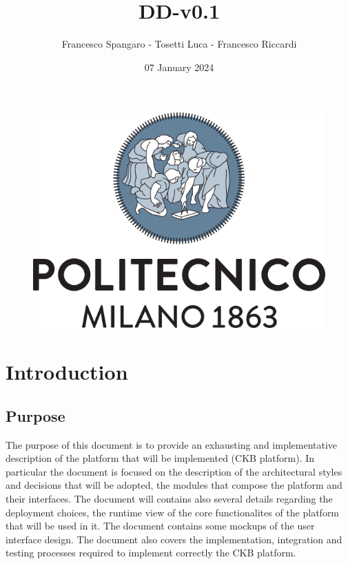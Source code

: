 \documentclass{article}
\title{DD-v0.1}
\author{Francesco Spangaro - Tosetti Luca - Francesco Riccardi}
\date{07 January 2024}
\begin{document}
\maketitle

\begin{figure}[h]
    \centering
    \includegraphics[scale=0.5]{politecnico-di-milano-logo.png}
\end{figure}

\tableofcontents

\newpage
\pagestyle{IntroductionStyle}

\section{Introduction}
\subsection{Purpose}
The purpose of this document is to provide an exhausting and implementative
description of the platform that will be implemented (CKB platform).
In particular the document is focused on the description of the architectural styles and decisions
that will be adopted, the modules that compose the platform and their interfaces.
The document will contains also several details regarding the deployment choices,
the runtime view of the core functionalites of the platform that will be used in it.
The document contains some mockups of the user interface design.
The document also covers the implementation, integration and testing
processes required to implement correctly the CKB platform.
\end{document}

